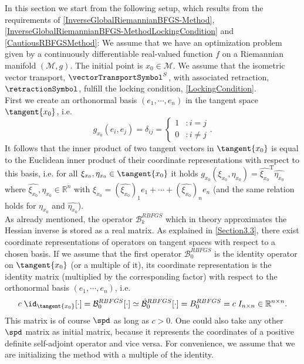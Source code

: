 In this section we start from the following setup, which results from the requirements of \cref{InverseGlobalRiemannianBFGS-Method}, \cref{InverseGlobalRiemannianBFGS-MethodLockingCondition} and \cref{CautiousRBFGSMethod}: We assume that we have an optimization problem given by a continuously differentiable real-valued function $f$ on a Riemannian manifold $(\mathcal{M}, g)$. The initial point is $x_0 \in \mathcal{M}$. We assume that the isometric vector transport, $\vectorTransportSymbol^S$, with associated retraction, $\retractionSymbol$, fulfill the locking condition, \cref{LockingCondition}. \\
First we create an orthonormal basis $(e_1, \cdots, e_n)$ in the tangent space $\tangent{x_0}$, i.e. 
\begin{equation*}
    g_{x_0}(e_i, e_j) = \delta_{ij} = \begin{cases} 1 &: i=j \\ 0 &: i \neq j \end{cases}.
\end{equation*}
It follows that the inner product of two tangent vectors in $\tangent{x_0}$ is equal to the Euclidean inner product of their coordinate representations with respect to this basis, i.e. for all $\xi_{x_0}, \eta_{x_0} \in \tangent{x_0}$ it holds $g_{x_0}(\xi_{x_0}, \eta_{x_0}) = \hat{\xi_{x_0}}^{\mathrm{T}} \hat{\eta_{x_0}}$ where $\hat{\xi_{x_0}}, \hat{\eta_{x_0}} \in \mathbb{R}^n$ with $\xi_{x_0} = (\hat{\xi_{x_0}})_1 e_1 + \cdots + (\hat{\xi_{x_0}})_n e_n$ (and the same relation holds for $\eta_{x_0}$ and $\hat{\eta_{x_0}}$). \\
As already mentioned, the operator $\mathcal{B}^{RBFGS}_k$ which in theory approximates the Hessian inverse is stored as a real matrix. As explained in \cref{Section3.3}, there exist coordinate representations of operators on tangent spaces with respect to a chosen basis. If we assume that the first operator $\mathcal{B}^{RBFGS}_0$ is the identity operator on $\tangent{x_0}$ (or a multiple of it), its coordinate representation is the identity matrix (multiplied by the corresponding factor) with respect to the orthonormal basis $(e_1, \cdots, e_n)$, i.e.
\begin{equation*}
    c \; \id_{\tangent{x_0}}[\cdot] = \mathcal{B}^{RBFGS}_0[\cdot] \simeq \hat{\mathcal{B}}^{RBFGS}_0[\cdot] = B^{RBFGS}_0 = c \; I_{n \times n} \in \mathbb{R}^{n \times n}.
\end{equation*}
This matrix is of course $\spd$ as long as $c > 0$. One could also take any other $\spd$ matrix as initial matrix, because it represents the coordinates of a positive definite self-adjoint operator and vice versa. For convenience, we assume that we are initializing the method with a multiple of the identity. \\
